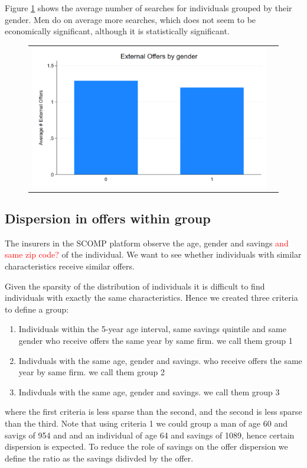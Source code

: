 \documentclass[12pt]{article}
\begin{document}
Figure \ref{fig:ie3_4b} shows the average number of searches for individuals grouped by their gender. Men do on average  more searches, which does not seem to be economically significant, although it is statistically significant.


\begin{figure}[H]
\caption{}
\label{fig:ie3_4b}
\centering{}%
\begin{tabular}{cc}
\includegraphics[scale=0.27]{../figures/IE3_search_by_gender.png}
\end{tabular}
\end{figure}


\subsection{Dispersion in offers within group}

The insurers in the SCOMP platform observe the age, gender and savings \textcolor{red}{and same zip code?} of the individual. We want to see whether individuals with similar characteristics receive similar offers. 

Given the sparsity of the distribution of individuals it is difficult to find individuals with exactly the same characteristics. Hence we created three criteria to define a group: 
\begin{enumerate}
    \item Individuals within the 5-year age interval, same savings quintile and same gender who receive offers the same year by same firm. we call them group 1  
    \item Indivduals with the same age, gender and savings. who receive offers the same year by same firm. we call them group 2
    \item   Indivduals with the same age, gender and savings. we call them group 3
\end{enumerate}
where the first criteria is less sparse than the second, and the second is less sparse than the third. 
Note that using criteria 1 we could group a man of age 60 and savigs of 954 and and an individual of age 64 and savings of 1089, hence certain dispersion is expected. To reduce the role of savings on the offer dispersion we define the ratio as the savings didivded by the offer. 
\end{document}
